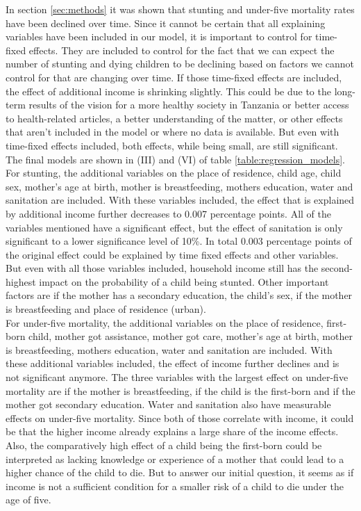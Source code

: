 \documentclass[a4paper, 11pt]{article} %
\begin{document}
In section \ref{sec:methods} it was shown that stunting and under-five mortality rates have been declined over time. Since it cannot be certain that all explaining variables have been included in our model, it is important to control for time-fixed effects. They are included to control for the fact that we can expect the number of stunting and dying children to be declining based on factors we cannot control for that are changing over time. If those time-fixed effects are included, the effect of additional income is shrinking slightly. This could be due to the long-term results of the vision for a more healthy society in Tanzania or better access to health-related articles, a better understanding of the matter, or other effects that aren't included in the model or where no data is available. But even with time-fixed effects included, both effects, while being small, are still significant. \\

The final models are shown in (III) and (VI) of table \ref{table:regression_models}. For stunting, the additional variables on the place of residence, child age, child sex, mother's age at birth, mother is breastfeeding, mothers education, water and sanitation are included. With these variables included, the effect that is explained by additional income further decreases to 0.007 percentage points. All of the variables mentioned have a significant effect, but the effect of sanitation is only significant to a lower significance level of 10\%. In total 0.003 percentage points of the original effect could be explained by time fixed effects and other variables. But even with all those variables included, household income still has the second-highest impact on the probability of a child being stunted. Other important factors are if the mother has a secondary education, the child's sex, if the mother is breastfeeding and place of residence (urban).  \\

For under-five mortality, the additional variables on the place of residence, first-born child, mother got assistance, mother got care, mother's age at birth, mother is breastfeeding, mothers education, water and sanitation are included. With these additional variables included, the effect of income further declines and is not significant anymore. The three variables with the largest effect on under-five mortality are if the mother is breastfeeding, if the child is the first-born and if the mother got secondary education. Water and sanitation also have measurable effects on under-five mortality. Since both of those correlate with income, it could be that the higher income already explains a large share of the income effects. Also, the comparatively high effect of a child being the first-born could be interpreted as lacking knowledge or experience of a mother that could lead to a higher chance of the child to die. But to answer our initial question, it seems as if income is not a sufficient condition for a smaller risk of a child to die under the age of five. \\
\end{document}
